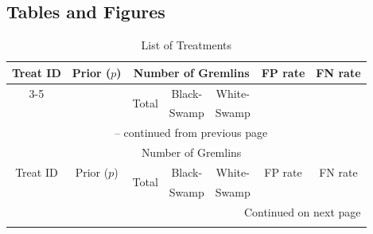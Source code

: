 \documentclass[12pt,a4paper]{article}
\begin{document}
\vspace{20pt}



\clearpage






\begin{appendices}
\appendix
\setcounter{table}{0}
\setcounter{figure}{0}
\renewcommand{\thetable}{\thesection\arabic{table}}
\renewcommand{\thefigure}{\thesection\arabic{figure}}
\singlespacing
\newpage


\section{Tables and Figures}

\begin{longtable}{ccccccc}
\caption{List of Treatments} \label{tab:treatment_app} \\
\toprule
\multirow{3}{8ex}{\centering Treat ID} & \multirow{3}{*}{Prior ($p$)} & \multicolumn{3}{c}{Number of Gremlins} & \multirow{3}{*}{FP rate} &  \multirow{3}{*}{FN rate} \\ \cmidrule(lr){3-5}
& & \multirow{2}{*}{Total} & Black- & White- \\
& & &Swamp& Swamp \\
\midrule
\endfirsthead

\multicolumn{7}{c}{{\tablename\ \thetable{} -- continued from previous page}} \\
\toprule
\multirow{3}{8ex}{\centering Treat ID} & \multirow{3}{*}{Prior ($p$)} & \multicolumn{3}{c}{Number of Gremlins} & \multirow{3}{*}{FP rate} &  \multirow{3}{*}{FN rate} \\ \cmidrule(lr){3-5}
& & \multirow{2}{*}{Total} & Black- & White- \\
& & &Swamp& Swamp \\
\midrule
\endhead

\midrule
\multicolumn{7}{r}{{Continued on next page}} \\
\endfoot

\bottomrule
\endlastfoot



\end{longtable}


\end{appendices}
\end{document}
